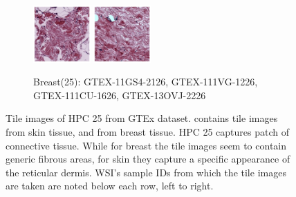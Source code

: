 \documentclass{l4proj}
\begin{document}
\begin{figure}[h]
\begin{subfigure}[b]{\textwidth}
        \includegraphics[width=0.24\textwidth]{images/breast25_3.png}
        \includegraphics[width=0.24\textwidth]{images/breast25_4.png}
        \caption{Breast(25): GTEX-11GS4-2126, GTEX-111VG-1226, GTEX-111CU-1626, GTEX-13OVJ-2226}
        \label{fig:breast25}
    \end{subfigure}
    \caption{Tile images of HPC 25 from GTEx dataset.  contains tile images from skin tissue, and  from breast tissue. HPC 25 captures patch of connective tissue. While for breast the tile images seem to contain generic fibrous areas, for skin they capture a specific appearance of the reticular dermis. WSI's sample IDs from which the tile images are taken are noted below each row, left to right.
    }\label{fig:hpc25}
\end{figure}
\end{document}
